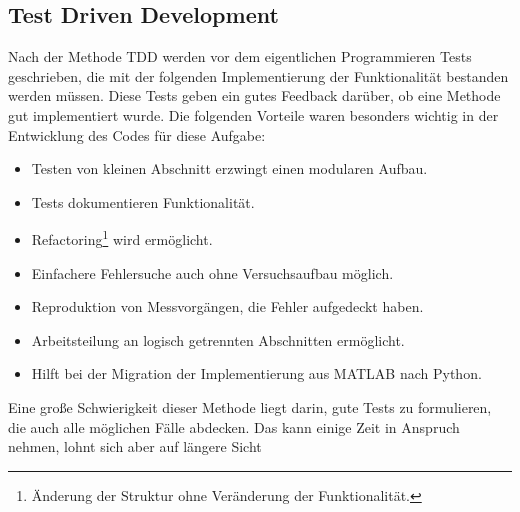 \documentclass[../Report.tex]{subfiles}
\begin{document}
\subsection{Test Driven Development}
\label{subsec:code.tdd}
Nach der Methode TDD werden vor dem eigentlichen Programmieren Tests geschrieben, die mit der folgenden Implementierung der Funktionalität bestanden werden müssen. Diese Tests geben ein gutes Feedback darüber, ob eine Methode gut implementiert wurde. Die folgenden Vorteile waren besonders wichtig in der Entwicklung des Codes für diese Aufgabe:
\begin{itemize}
	\item Testen von kleinen Abschnitt erzwingt einen modularen Aufbau.
	\item Tests dokumentieren Funktionalität.
	\item Refactoring\footnote{Änderung der Struktur ohne Veränderung der Funktionalität.} wird ermöglicht.
	\item Einfachere Fehlersuche auch ohne Versuchsaufbau möglich.
	\item Reproduktion von Messvorgängen, die Fehler aufgedeckt haben.
	\item Arbeitsteilung an logisch getrennten Abschnitten ermöglicht.
	\item Hilft bei der Migration der Implementierung aus MATLAB nach Python.
\end{itemize}
Eine große Schwierigkeit dieser Methode liegt darin, gute Tests zu formulieren, die auch alle möglichen Fälle abdecken. Das kann einige Zeit in Anspruch nehmen, lohnt sich aber auf längere Sicht
\end{document}
